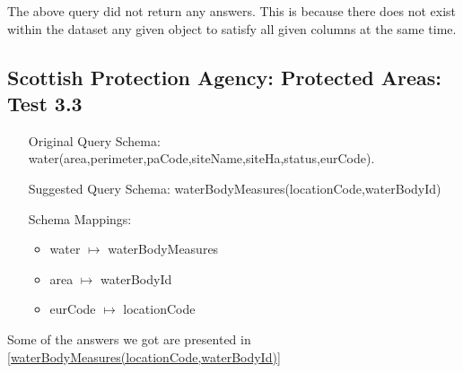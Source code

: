 \documentclass[a4paper,10pt]{article}
\begin{document}
The above query did not return any answers. This is because there does not exist within the dataset any given object to satisfy all 
given columns at the same time. 



\subsection{ Scottish Protection Agency: Protected Areas: Test 3.3}
\label{Test 3.3}

\begin{itemize}
\item[Original Query Schema:] water(area,perimeter,paCode,siteName,siteHa,status,eurCode).

\item[Suggested Query Schema: ]
waterBodyMeasures(locationCode,waterBodyId)
\item[Schema Mappings:] 
	\begin{itemize}
	
\item water $\mapsto$ waterBodyMeasures
\item area  $\mapsto$ waterBodyId
\item eurCode  $\mapsto$ locationCode

	\end{itemize}

\end{itemize}

Some of the answers we got are presented in  \ref{waterBodyMeasures(locationCode,waterBodyId)}
\end{document}

